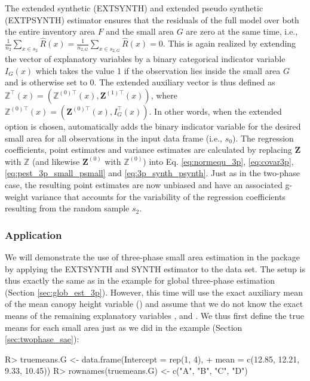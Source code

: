 \documentclass[article]{jss}
\begin{document}
The extended synthetic (EXTSYNTH) and extended pseudo synthetic (EXTPSYNTH) estimator ensures that the residuals of the full model over both the entire inventory area $F$ and the small area $G$ are zero at the same time, i.e., $\frac{1}{n_{2}}\sum_{x \in s_{2}}\hat{R}(x) = \frac{1}{n_{2,G}}\sum_{x \in s_{2,G}}\hat{R}(x)=0$. This is again realized by extending the vector of explanatory variables by a binary categorical indicator variable $I_G(x)$ which takes the value 1 if the observation lies inside the small area $G$ and is otherwise set to 0. The extended auxiliary vector is thus defined as $\pmb{\mathbb{Z}}^{\top}(x)=(\pmb{\mathbb{Z}}^{(0)\top}(x),\pmb{Z}^{(1)\top}(x))$, where $\pmb{\mathbb{Z}}^{(0)\top}(x)=(\pmb{Z}^{(0)\top}(x), I_G^{\top}(x))$. In other words, when the extended option is chosen,  automatically adds the binary indicator variable for the desired small area for all observations in the input data frame (i.e., $s_0$). The regression coefficients, point estimates and variance estimates are calculated by replacing $\pmb{Z}$ with $\pmb{\mathbb{Z}}$ (and likewise $\pmb{Z}^{(0)}$ with $\pmb{\mathbb{Z}}^{(0)}$) into Eq. \ref{eq:normequ_3p}, \ref{eq:covar3p}, \ref{eq:pest_3p_small_psmall} and \ref{eq:3p_synth_psynth}. Just as in the two-phase case, the resulting point estimates are now unbiased and have an associated g-weight variance that accounts for the variability of the regression coefficients resulting from the random sample $s_2$.


\subsubsection{Application}


We will demonstrate the use of three-phase small area estimation in the package  by applying the EXTSYNTH and SYNTH estimator to the  data set. The setup is thus exactly the same as in the example for global three-phase estimation (Section \ref{sec:glob_est_3p}). However, this time will use the exact auxiliary mean of the mean canopy height variable () and assume that we do not know the exact means of the remaining explanatory variables ,  and . We thus first define the true means for each small area just as we did in the  example (Section \ref{sec:twophase_sae}):


\begin{Schunk}
\begin{Sinput}
R> truemeans.G <- data.frame(Intercept = rep(1, 4),
+    mean = c(12.85, 12.21, 9.33, 10.45))
R> rownames(truemeans.G) <- c("A", "B", "C", "D")
\end{Sinput}
\end{Schunk}
\end{document}
